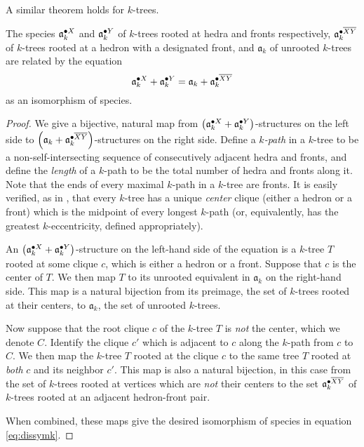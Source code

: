 \documentclass[sectionflow,singlespace,twoside,boldmathhdr,draft]{brandiss} %
\numberwithin{section}{chapter}
\numberwithin{figure}{chapter}
\begin{document}
A similar theorem holds for $k$-trees.
\begin{theorem}
  \label{thm:dissymk}
  The species $\pointed[X]{\mathfrak{a}}_{k}$ and $\pointed[Y]{\mathfrak{a}}_{k}$ of $k$-trees rooted at hedra and fronts respectively, $\pointed[\overline{XY}]{\mathfrak{a}}_{k}$ of $k$-trees rooted at a hedron with a designated front, and $\mathfrak{a}_{k}$ of unrooted $k$-trees are related by the equation
  \begin{equation}
    \label{eq:dissymk}
    \pointed[X]{\mathfrak{a}}_{k} + \pointed[Y]{\mathfrak{a}}_{k} = \mathfrak{a}_{k} + \pointed[\overline{XY}]{\mathfrak{a}}_{k}
  \end{equation}
  as an isomorphism of species.
\end{theorem}

\begin{proof}
  We give a bijective, natural map from $\pbrac{\pointed[X]{\mathfrak{a}}_{k} + \pointed[Y]{\mathfrak{a}}_{k}}$-structures on the left side to $\pbrac{\mathfrak{a}_{k} + \pointed[\overline{XY}]{\mathfrak{a}}_{k}}$-structures on the right side.
  Define a \emph{$k$-path} in a $k$-tree to be a non-self-intersecting sequence of consecutively adjacent hedra and fronts, and define the \emph{length} of a $k$-path to be the total number of hedra and fronts along it.
  Note that the ends of every maximal $k$-path in a $k$-tree are fronts.
  It is easily verified, as in \cite{kob:ktlogspace}, that every $k$-tree has a unique \emph{center} clique (either a hedron or a front) which is the midpoint of every longest $k$-path (or, equivalently, has the greatest $k$-eccentricity, defined appropriately).
  
  An $\pbrac{\pointed[X]{\mathfrak{a}}_{k} + \pointed[Y]{\mathfrak{a}}_{k}}$-structure on the left-hand side of the equation is a $k$-tree $T$ rooted at some clique $c$, which is either a hedron or a front.
  Suppose that $c$ is the center of $T$.
  We then map $T$ to its unrooted equivalent in $\mathfrak{a}_{k}$ on the right-hand side.
  This map is a natural bijection from its preimage, the set of $k$-trees rooted at their centers, to $\mathfrak{a}_{k}$, the set of unrooted $k$-trees.

  Now suppose that the root clique $c$ of the $k$-tree $T$ is \emph{not} the center, which we denote $C$.
  Identify the clique $c'$ which is adjacent to $c$ along the $k$-path from $c$ to $C$.
  We then map the $k$-tree $T$ rooted at the clique $c$ to the same tree $T$ rooted at \emph{both} $c$ and its neighbor $c'$.
  This map is also a natural bijection, in this case from the set of $k$-trees rooted at vertices which are \emph{not} their centers to the set $\pointed[\overline{XY}]{\mathfrak{a}}_{k}$ of $k$-trees rooted at an adjacent hedron-front pair.

  When combined, these maps give the desired isomorphism of species in equation \eqref{eq:dissymk}.
\end{proof}
\end{document}
